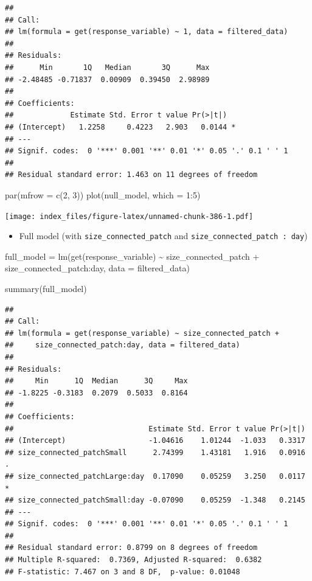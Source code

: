\documentclass[
]{article}
\newenvironment{Shaded}{\begin{snugshade}}{\end{snugshade}}
\newcommand{\AttributeTok}[1]{\textcolor[rgb]{0.77,0.63,0.00}{#1}}
\newcommand{\DecValTok}[1]{\textcolor[rgb]{0.00,0.00,0.81}{#1}}
\newcommand{\FunctionTok}[1]{\textcolor[rgb]{0.00,0.00,0.00}{#1}}
\newcommand{\NormalTok}[1]{#1}
\newcommand{\OtherTok}[1]{\textcolor[rgb]{0.56,0.35,0.01}{#1}}
\newcommand{\SpecialCharTok}[1]{\textcolor[rgb]{0.00,0.00,0.00}{#1}}
\providecommand{\tightlist}{%
  \setlength{\itemsep}{0pt}\setlength{\parskip}{0pt}}
\begin{document}
\begin{verbatim}
## 
## Call:
## lm(formula = get(response_variable) ~ 1, data = filtered_data)
## 
## Residuals:
##      Min       1Q   Median       3Q      Max 
## -2.48485 -0.71837  0.00909  0.39450  2.98989 
## 
## Coefficients:
##             Estimate Std. Error t value Pr(>|t|)  
## (Intercept)   1.2258     0.4223   2.903   0.0144 *
## ---
## Signif. codes:  0 '***' 0.001 '**' 0.01 '*' 0.05 '.' 0.1 ' ' 1
## 
## Residual standard error: 1.463 on 11 degrees of freedom
\end{verbatim}

\begin{Shaded}
\begin{Highlighting}[]
\FunctionTok{par}\NormalTok{(}\AttributeTok{mfrow =} \FunctionTok{c}\NormalTok{(}\DecValTok{2}\NormalTok{, }\DecValTok{3}\NormalTok{))}
\FunctionTok{plot}\NormalTok{(null\_model, }\AttributeTok{which =} \DecValTok{1}\SpecialCharTok{:}\DecValTok{5}\NormalTok{)}
\end{Highlighting}
\end{Shaded}

\texttt{[image: index\_files/figure-latex/unnamed-chunk-386-1.pdf]}

\begin{itemize}
\tightlist
\item
  Full model (with \texttt{size\_connected\_patch} and
  \texttt{size\_connected\_patch\ :\ day})
\end{itemize}

\begin{Shaded}
\begin{Highlighting}[]
\NormalTok{full\_model }\OtherTok{=} \FunctionTok{lm}\NormalTok{(}\FunctionTok{get}\NormalTok{(response\_variable) }\SpecialCharTok{\textasciitilde{}}
\NormalTok{                  size\_connected\_patch }\SpecialCharTok{+}
\NormalTok{                  size\_connected\_patch}\SpecialCharTok{:}\NormalTok{day,}
                \AttributeTok{data =}\NormalTok{ filtered\_data)}

\FunctionTok{summary}\NormalTok{(full\_model)}
\end{Highlighting}
\end{Shaded}

\begin{verbatim}
## 
## Call:
## lm(formula = get(response_variable) ~ size_connected_patch + 
##     size_connected_patch:day, data = filtered_data)
## 
## Residuals:
##     Min      1Q  Median      3Q     Max 
## -1.8225 -0.3183  0.2079  0.5033  0.8164 
## 
## Coefficients:
##                               Estimate Std. Error t value Pr(>|t|)  
## (Intercept)                   -1.04616    1.01244  -1.033   0.3317  
## size_connected_patchSmall      2.74399    1.43181   1.916   0.0916 .
## size_connected_patchLarge:day  0.17090    0.05259   3.250   0.0117 *
## size_connected_patchSmall:day -0.07090    0.05259  -1.348   0.2145  
## ---
## Signif. codes:  0 '***' 0.001 '**' 0.01 '*' 0.05 '.' 0.1 ' ' 1
## 
## Residual standard error: 0.8799 on 8 degrees of freedom
## Multiple R-squared:  0.7369, Adjusted R-squared:  0.6382 
## F-statistic: 7.467 on 3 and 8 DF,  p-value: 0.01048
\end{verbatim}
\end{document}

